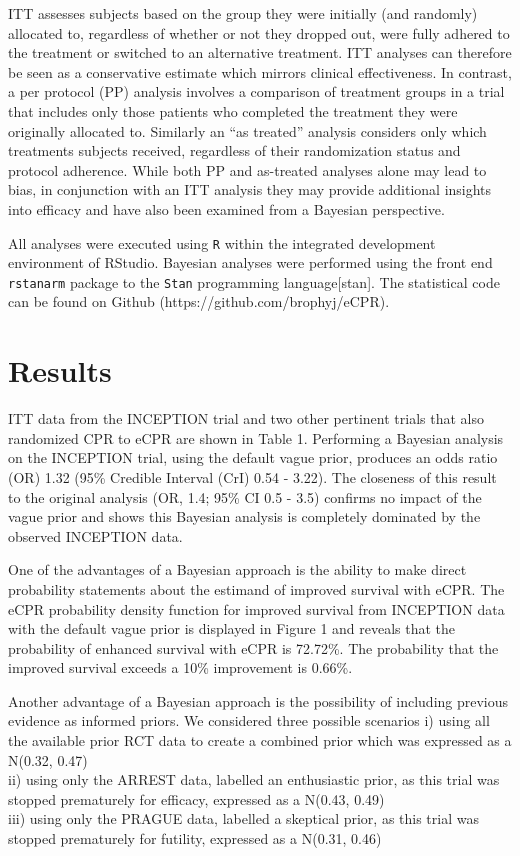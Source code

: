 \documentclass[
  super,
  preprint,
  3p]{elsarticle}
\begin{document}
ITT assesses subjects based on the group they were initially (and
randomly) allocated to, regardless of whether or not they dropped out,
were fully adhered to the treatment or switched to an alternative
treatment. ITT analyses can therefore be seen as a conservative estimate
which mirrors clinical effectiveness. In contrast, a per protocol (PP)
analysis involves a comparison of treatment groups in a trial that
includes only those patients who completed the treatment they were
originally allocated to. Similarly an ``as treated'' analysis considers
only which treatments subjects received, regardless of their
randomization status and protocol adherence. While both PP and
as-treated analyses alone may lead to bias, in conjunction with an ITT
analysis they may provide additional insights into efficacy and have
also been examined from a Bayesian perspective.

All analyses were executed using \texttt{R}\citep{R} within the
integrated development environment of RStudio. Bayesian analyses were
performed using the front end \texttt{rstanarm} package\citep{rstanarm}
to the \texttt{Stan} programming language{[}stan{]}. The statistical
code can be found on Github (https://github.com/brophyj/eCPR).

\hypertarget{results}{%
\section{Results}\label{results}}

ITT data from the INCEPTION trial\citep{CPR2023a} and two other
pertinent trials\citep{RN6751, RN6759} that also randomized CPR to eCPR
are shown in Table 1. Performing a Bayesian analysis on the INCEPTION
trial, using the default vague prior, produces an odds ratio (OR) 1.32
(95\% Credible Interval (CrI) 0.54 - 3.22). The closeness of this result
to the original analysis (OR, 1.4; 95\% CI 0.5 - 3.5) confirms no impact
of the vague prior and shows this Bayesian analysis is completely
dominated by the observed INCEPTION data.

One of the advantages of a Bayesian approach is the ability to make
direct probability statements about the estimand of improved survival
with eCPR. The eCPR probability density function for improved survival
from INCEPTION data with the default vague prior is displayed in Figure
1 and reveals that the probability of enhanced survival with eCPR is
72.72\%. The probability that the improved survival exceeds a 10\%
improvement is 0.66\%.

Another advantage of a Bayesian approach is the possibility of including
previous evidence as informed priors. We considered three possible
scenarios i) using all the available prior RCT
data\citep{RN6751, RN6759} to create a combined prior which was
expressed as a N(0.32, 0.47)\\
ii) using only the ARREST data, labelled an enthusiastic prior, as this
trial was stopped prematurely for efficacy, expressed as a N(0.43,
0.49)\\
iii) using only the PRAGUE data, labelled a skeptical prior, as this
trial was stopped prematurely for futility, expressed as a N(0.31, 0.46)
\end{document}
